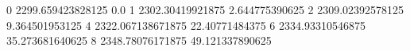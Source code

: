 0 2299.659423828125 0.0
1 2302.30419921875 2.644775390625
2 2309.02392578125 9.364501953125
4 2322.067138671875 22.40771484375
6 2334.93310546875 35.273681640625
8 2348.78076171875 49.121337890625
